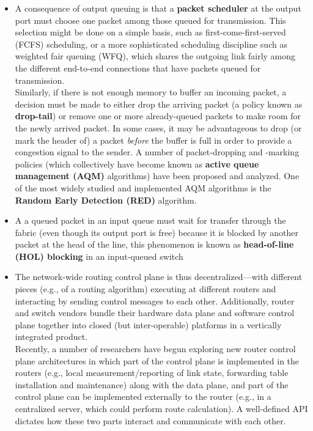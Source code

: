 \begin{itemize}
\item
A consequence of output queuing is that a \textbf{packet scheduler} at the output port must choose one packet among those queued for transmission. This selection might be done on a simple basis, such as first-come-first-served (FCFS) scheduling, or a more sophisticated scheduling discipline such as weighted fair queuing (WFQ), which shares the outgoing link fairly among the different end-to-end connections that have packets queued for transmission.\\
Similarly, if there is not enough memory to buffer an incoming packet, a decision must be made to either drop the arriving packet (a policy known as \textbf{drop-tail}) or remove one or more already-queued packets to make room for the newly arrived packet. In some cases, it may be advantageous to drop (or mark the header of) a packet \textit{before} the buffer is full in order to provide a congestion signal to the sender. A number of packet-dropping and -marking policies (which collectively have become known as \textbf{active queue management (AQM)} algorithms) have been proposed and analyzed. One of the most widely studied and implemented AQM algorithms is the \textbf{Random Early Detection (RED)} algorithm.

\item
A a queued packet in an input queue must wait for transfer through the fabric (even though its output port is free) because it is blocked by another packet at the head of the line, this phenomenon is known as \textbf{head-of-line (HOL) blocking} in an input-queued switch

\item
The network-wide routing control plane is thus decentralized---with different pieces (e.g., of a routing algorithm) executing at different routers and interacting by sending control messages to each other. Additionally, router and switch vendors bundle their hardware data plane and software control plane together into closed (but inter-operable) platforms in a vertically integrated product.\\
Recently, a number of researchers have begun exploring new router control plane architectures in which part of the control plane is implemented in the routers (e.g., local measurement/reporting of link state, forwarding table installation and maintenance) along with the data plane, and part of the control plane can be implemented externally to the router (e.g., in a centralized server, which could perform route calculation). A well-defined API dictates how these two parts interact and communicate with each other.


\end{itemize}
